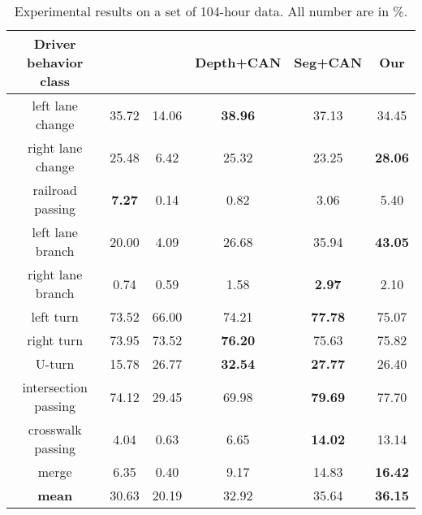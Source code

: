 \documentclass[10pt,twocolumn,letterpaper]{article}
\begin{document}
\begin{table}
\small
\caption{Experimental results on a set of 104-hour data. All number are in \%.} %
\centering %
  \begin{adjustbox}{max width=8cm}
\begin{tabular}{c c c c c c} %
\hline\hline %
Driver behavior class  &\cite{RamanishkaCVPR2018} & \cite{santana2016learning} & Depth+CAN & Seg+CAN & Our  \\ [0.5ex] %
\hline %
left lane change & 35.72 & 14.06& \textbf{38.96} &37.13&34.45  \\ 
right lane change & 25.48 & 6.42&25.32 &23.25&\bf{28.06} \\
railroad passing & \textbf{7.27} & 0.14& 0.82 &3.06&5.40  \\
left lane branch & 20.00 & 4.09 & 26.68 &35.94&\bf{43.05} \\
right lane branch & 0.74 & 0.59 &{1.58} &\bf{2.97}& {2.10} \\
left turn & 73.52 & 66.00&{74.21} &\bf{77.78}& 75.07 \\
right turn & 73.95 & 73.52 &\bf{76.20} &75.63&75.82 \\
U-turn & 15.78 & 26.77 &\bf{32.54} &\bf{27.77}&{26.40} \\
intersection passing & 74.12 & 29.45 &69.98 &\bf{79.69} &{77.70} \\
crosswalk passing & 4.04 & 0.63 &6.65 &\bf{14.02}&{13.14} \\
merge  & 6.35 & 0.40 &9.17 &14.83&\bf{16.42} \\[1ex] %
\hline
\textbf{mean} & 30.63 & 20.19 &32.92 &35.64&\textbf{36.15} \\[0.5ex]

\hline %
\end{tabular}
\end{adjustbox}
\label{table:results} %
\end{table}
\end{document}
